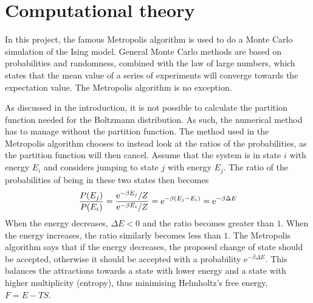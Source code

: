\documentclass[12pt,english,a4paper]{article}
\renewcommand{\exp}[1]{\mathrm{e}^{#1}}
\begin{document}
\clearpage
\section{Computational theory}
In this project, the famous Metropolis algorithm is used to do a Monte Carlo simulation of the Ising model. General Monte Carlo methods are based on probabilities and randomness, combined with the law of large numbers, which states that the mean value of a series of experiments will converge towards the expectation value. The Metropolis algorithm is no exception.

As discussed in the introduction, it is not possible to calculate the partition function needed for the Boltzmann distribution. As such, the numerical method has to manage without the partition function. The method used in the Metropolis algorithm chooses to instead look at the ratios of the probabilities, as the partition function will then cancel. Assume that the system is in state \(i\) with energy \(E_i\) and considers jumping to state \(j\) with energy \(E_j\). The ratio of the probabilities of being in these two states then becomes
\[
\frac{P(E_j)}{P(E_i)} = \frac{\exp{-\beta E_j}/Z}{\exp{-\beta E_i}/Z} = \exp{-\beta\qty(E_j-E_i)} = \exp{-\beta\Delta E}
\]
When the energy decreases, \(\Delta E<0\) and the ratio becomes greater than \(1\). When the energy increases, the ratio similarly becomes less than \(1\). The Metropolis algorithm says that if the energy decreases, the proposed change of state should be accepted, otherwise it should be accepted with a probability \(\exp{-\beta\Delta E}\). This balances the attractions towards a state with lower energy and a state with higher multiplicity (entropy), thus minimising Helmholtz's free energy, \(F=E-TS\).
\end{document}
